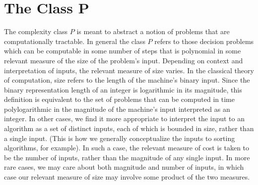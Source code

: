





\section{The Class P}

The complexity class $P$ is meant to abstract a notion of problems
that are computationally tractable.  In general the class $P$ refers
to those decision problems which can be computable in some number of
steps that is polynomial in some relevant measure of the size of the
problem's input.  Depending on context and interpretation of inputs,
the relevant measure of size varies. In the classical theory of
computation, size refers to the length of the machine's binary input.
Since the binary representation length of an integer is logarithmic in
its magnitude, this definition is equivalent to the set of problems
that can be computed in time polylogarithmic in the magnitude of the
machine's input interpreted as an integer.  In other cases, we find it
more appropriate to interpret the input to an algorithm as a set of
distinct inputs, each of which is bounded in size, rather than a
single input.  (This is how we generally conceptualize the inputs to
sorting algorithms, for example).  In such a case, the relevant
measure of cost is taken to be the number of inputs, rather than the
magnitude of any single input.  In more rare cases, we may care about
both magnitude and number of inputs, in which case our relevant measure
of size may involve some product of the two measures.\\

